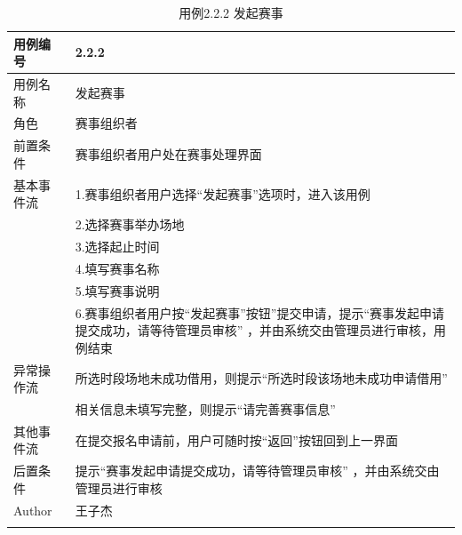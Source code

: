 \documentclass[a4paper,UTF8]{article}
\begin{document}
\begin{table}[H]
	\begin{center}
		\caption{用例2.2.2 发起赛事}
		\label{table:Tab_uc222}
		\begin{tabular}{|p{}|p{}|}
			\hline\noalign{\smallskip}
			用例编号 & 2.2.2\\
			\hline
			用例名称 &  发起赛事\\
			\hline
			角色 & 赛事组织者\\
			\hline
			前置条件 & 赛事组织者用户处在赛事处理界面\\
			\hline
			基本事件流 & 1.赛事组织者用户选择“发起赛事”选项时，进入该用例 \\& 2.选择赛事举办场地\\& 3.选择起止时间 \\& 4.填写赛事名称 \\& 5.填写赛事说明\\& 6.赛事组织者用户按“发起赛事”按钮”提交申请，提示“赛事发起申请提交成功，请等待管理员审核” ，并由系统交由管理员进行审核，用例结束\\
			\hline
			异常操作流 & 所选时段场地未成功借用，则提示“所选时段该场地未成功申请借用” \\& 相关信息未填写完整，则提示“请完善赛事信息”\\
			\hline
			其他事件流 & 在提交报名申请前，用户可随时按“返回”按钮回到上一界面\\
			\hline
			后置条件 & 提示“赛事发起申请提交成功，请等待管理员审核” ，并由系统交由管理员进行审核\\
			\hline
			Author & 王子杰 \\
			\noalign{\smallskip}
			\hline
			\noalign{\smallskip}
		\end{tabular}
	\end{center}
\end{table}
\end{document}
